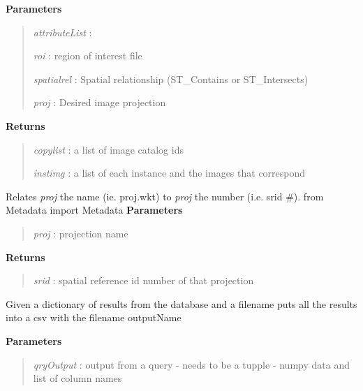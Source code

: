 \documentclass[letterpaper,10pt,openany,oneside]{sphinxmanual}
\begin{document}
\begin{fulllineitems}
\begin{fulllineitems}
\textbf{Parameters}
\begin{quote}

\emph{attributeList} :

\emph{roi}           : region of interest file

\emph{spatialrel}    : Spatial relationship (ST\_Contains or ST\_Intersects)

\emph{proj}          : Desired image projection
\end{quote}

\textbf{Returns}
\begin{quote}

\emph{copylist} : a list of image catalog ids

\emph{instimg}  : a list of each instance and the images that correspond
\end{quote}

\end{fulllineitems}


\begin{fulllineitems}
\label{code:Database.Database.dbProj}
Relates \emph{proj} the name (ie. proj.wkt) to \emph{proj} the number (i.e. srid \#).
from Metadata import Metadata
\textbf{Parameters}
\begin{quote}

\emph{proj} : projection name
\end{quote}

\textbf{Returns}
\begin{quote}

\emph{srid} : spatial reference id number of that projection
\end{quote}

\end{fulllineitems}


\begin{fulllineitems}
\label{code:Database.Database.exportToCSV}
Given a dictionary of results from the database and a filename puts all the results
into a csv with the filename outputName

\textbf{Parameters}
\begin{quote}

\emph{qryOutput}  : output from a query - needs to be a tupple - numpy data and list of column names


\end{quote}
\end{fulllineitems}
\end{fulllineitems}
\end{document}
